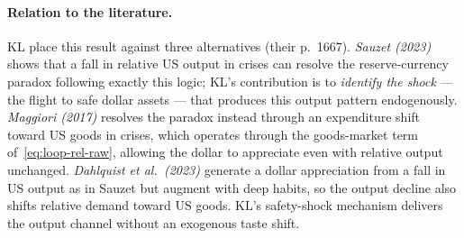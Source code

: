 \paragraph{Relation to the literature.} KL place this result against three
alternatives (their p.~1667). \emph{Sauzet (2023)} shows that a fall in relative
US output in crises can resolve the reserve-currency paradox following exactly
this logic; KL's contribution is to \emph{identify the shock} --- the flight to
safe dollar assets --- that produces this output pattern endogenously.
\emph{Maggiori (2017)} resolves the paradox instead through an expenditure shift
toward US goods in crises, which operates through the goods-market term
of~\eqref{eq:loop-rel-raw}, allowing the dollar to appreciate even with relative
output unchanged. \emph{Dahlquist et al.\ (2023)} generate a dollar appreciation
from a fall in US output as in Sauzet but augment with deep habits, so the output
decline also shifts relative demand toward US goods. KL's safety-shock mechanism
delivers the output channel without an exogenous taste shift.

